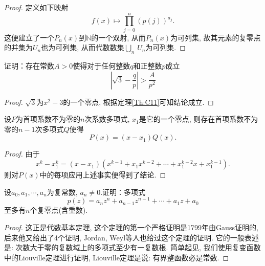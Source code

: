 \begin{quiza}
\begin{proof}
定义如下映射\[f(x)\mapsto\prod_{j=0}^{n}\left(p(j)\right)^{a_j}.\]
这便建立了一个\(P_n(x)\)到\(\mathbb{N}\)的一个双射, 从而\(P_n(x)\)为可列集, 故其元素的复零点的并集为\(U_n\)也为可列集, 从而代数数集\(\underset{n}{\bigcup}\,U_n\)为可列集.
\end{proof}
\woe 证明：存在常数\(A>0\)使得对于任何整数\(q\)和正整数\(p\)成立\[\left|\sqrt{3}-\frac{q}{p}\right|>\frac{A}{p^2}\]
\begin{proof}
\(\sqrt{3}\)为\(x^2-3\)的一个零点, 根据定理\ref{Th:C11}可知结论成立.
\end{proof}
\end{quiza}
\begin{quizb}
\woe 设\(P\)为首项系数不为零的\(n\)次系数多项式, \(x_1\)是它的一个零点, 则存在首项系数不为零的\(n-1\)次多项式\(Q\)使得\[P(x)=(x-x_1)Q(x).\]
\begin{proof}
由于\[x^k-x_1^k=(x-x_1)\left(x^{k-1}+x_1x^{k-2}+\cdots+x_1^{k-2}x+x_1^{k-1}\right).\]则对\(P(x)\)中的每项应用上述事实便得到了结论.
\end{proof}
\woe 设\(a_0,a_1,\cdots,a_n\)为复常数, \(a_n\ne 0\).证明：多项式\[p(z)=a_nz^n+a_{n-1}z^{n-1}+\cdots+a_1z+a_0\]至多有\(n\)个复零点(含重数).
\begin{proof}
这正是代数基本定理, 这个定理的第一个严格证明是1799年由Gauss证明的, 后来他又给出了4个证明, Jordan, Weyl等人也给过这个定理的证明. 它的一般表述是: 次数大于零的复数域上的多项式至少有一复数根. 简单起见, 我们使用复变函数中的Liouville定理进行证明, Liouville定理是说: 有界整函数必是常数.


\end{proof}
\end{quizb}
